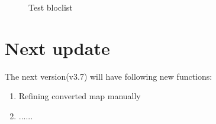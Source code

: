 \documentclass{article}
\begin{document}
    \begin{figure}[htbp]
        \centering
        \caption{Test bloclist}
        \label{testBlockListNBT}
    \end{figure}

    
\section{Next update}
    The next version(v3.7) will have following new functions:
    \begin{enumerate}
        \item Refining converted map manually
        \item ......
    \end{enumerate}
\end{document}
